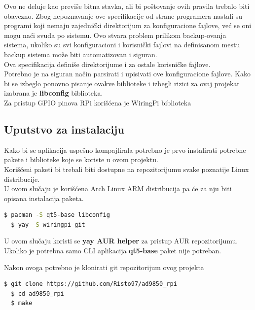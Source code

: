 Ovo ne deluje kao previše bitna stavka, ali bi poštovanje ovih pravila trebalo
biti obavezno.
Zbog nepoznavanje ove specifikacije od strane programera nastali su programi
koji nemaju zajednički direktorijum za konfiguracione fajlove, već se oni mogu naći
svuda po sistemu.
Ovo stvara problem prilikom backup-ovanja sistema, ukoliko su svi konfiguracioni
i korisnički fajlovi na definisanom mestu backup sistema može biti automatizovan i siguran. \\
Ova specifikacija definiše direktorijume i za ostale korisničke fajlove. \\

Potrebno je na siguran način parsirati i upisivati ove konfiguracione fajlove.
Kako bi se izbeglo ponovno pisanje ovakve biblioteke i izbegli rizici za ovaj projekat izabrana je \textbf{libconfig}\cite{libconfig} biblioteka.\\

Za pristup GPIO pinova RPi korišćena je WiringPi\cite{WiringPi} biblioteka

\subsection{Uputstvo za instalaciju}

Kako bi se aplikacija uspešno kompajlirala potrebno je prvo instalirati potrebne
pakete i biblioteke koje se koriste u ovom projektu. \\
Korišćeni paketi bi trebali biti dostupne na repozitorijumu svake poznatije Linux
distribucije. \\
U ovom slučaju je korišćena Arch Linux ARM distribucija pa će za nju biti
opisana instalacija paketa.

\begin{lstlisting}[language=bash, basicstyle=\normalsize]
  $ pacman -S qt5-base libconfig
  $ yay -S wiringpi-git
\end{lstlisting}

U ovom slučaju koristi se \textbf{yay AUR helper} za pristup AUR repozitorijumu.
Ukoliko je potrebna samo CLI aplikacija \textbf{qt5-base} paket nije potreban.\\
\newpage

Nakon ovoga potrebno je klonirati git repozitorijum ovog projekta

\begin{lstlisting}[language=bash, basicstyle=\normalsize]
  $ git clone https://github.com/Risto97/ad9850_rpi
  $ cd ad9850_rpi
  $ make
\end{lstlisting} %

